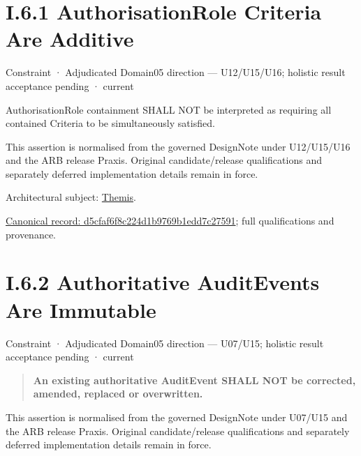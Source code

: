 \section*{I.6.1 AuthorisationRole Criteria Are Additive}
\label{navigation:I.6.1}

\label{element:d5cfaf6f8c224d1b9769b1edd7c27591}
{\small Constraint · Adjudicated Domain05 direction — U12/U15/U16; holistic result acceptance pending · current}\par

AuthorisationRole containment SHALL NOT be interpreted as requiring all contained Criteria to be simultaneously satisfied.



This assertion is normalised from the governed DesignNote under U12/U15/U16 and the ARB release Praxis. Original candidate/release qualifications and separately deferred implementation details remain in force.



Architectural subject: \hyperref[element:899d34ec491948b68aad09e507dea6d1]{Themis}.


{\footnotesize \href{../../../../continuum/motivation/constraint/d5cfaf6f8c224d1b9769b1edd7c27591.md}{Canonical record: d5cfaf6f8c224d1b9769b1edd7c27591}; full qualifications and provenance.}\par
\section*{I.6.2 Authoritative AuditEvents Are Immutable}
\label{navigation:I.6.2}

\label{element:21eb20cdc600411cb71fbfe2abce4dbe}
{\small Constraint · Adjudicated Domain05 direction — U07/U15; holistic result acceptance pending · current}\par

\begin{quote}


\textbf{An existing authoritative AuditEvent SHALL NOT be corrected, amended, replaced or overwritten.}



\end{quote}


This assertion is normalised from the governed DesignNote under U07/U15 and the ARB release Praxis. Original candidate/release qualifications and separately deferred implementation details remain in force.



